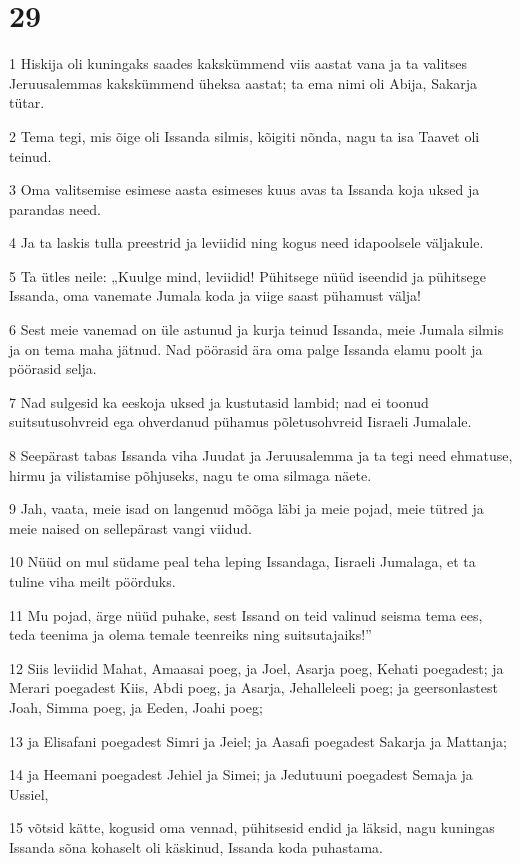 \chapter{29}

\par 1 Hiskija oli kuningaks saades kakskümmend viis aastat vana ja ta valitses Jeruusalemmas kakskümmend üheksa aastat; ta ema nimi oli Abija, Sakarja tütar.
\par 2 Tema tegi, mis õige oli Issanda silmis, kõigiti nõnda, nagu ta isa Taavet oli teinud.
\par 3 Oma valitsemise esimese aasta esimeses kuus avas ta Issanda koja uksed ja parandas need.
\par 4 Ja ta laskis tulla preestrid ja leviidid ning kogus need idapoolsele väljakule.
\par 5 Ta ütles neile: „Kuulge mind, leviidid! Pühitsege nüüd iseendid ja pühitsege Issanda, oma vanemate Jumala koda ja viige saast pühamust välja!
\par 6 Sest meie vanemad on üle astunud ja kurja teinud Issanda, meie Jumala silmis ja on tema maha jätnud. Nad pöörasid ära oma palge Issanda elamu poolt ja pöörasid selja.
\par 7 Nad sulgesid ka eeskoja uksed ja kustutasid lambid; nad ei toonud suitsutusohvreid ega ohverdanud pühamus põletusohvreid Iisraeli Jumalale.
\par 8 Seepärast tabas Issanda viha Juudat ja Jeruusalemma ja ta tegi need ehmatuse, hirmu ja vilistamise põhjuseks, nagu te oma silmaga näete.
\par 9 Jah, vaata, meie isad on langenud mõõga läbi ja meie pojad, meie tütred ja meie naised on sellepärast vangi viidud.
\par 10 Nüüd on mul südame peal teha leping Issandaga, Iisraeli Jumalaga, et ta tuline viha meilt pöörduks.
\par 11 Mu pojad, ärge nüüd puhake, sest Issand on teid valinud seisma tema ees, teda teenima ja olema temale teenreiks ning suitsutajaiks!”
\par 12 Siis leviidid Mahat, Amaasai poeg, ja Joel, Asarja poeg, Kehati poegadest; ja Merari poegadest Kiis, Abdi poeg, ja Asarja, Jehalleleeli poeg; ja geersonlastest Joah, Simma poeg, ja Eeden, Joahi poeg;
\par 13 ja Elisafani poegadest Simri ja Jeiel; ja Aasafi poegadest Sakarja ja Mattanja;
\par 14 ja Heemani poegadest Jehiel ja Simei; ja Jedutuuni poegadest Semaja ja Ussiel,
\par 15 võtsid kätte, kogusid oma vennad, pühitsesid endid ja läksid, nagu kuningas Issanda sõna kohaselt oli käskinud, Issanda koda puhastama.

